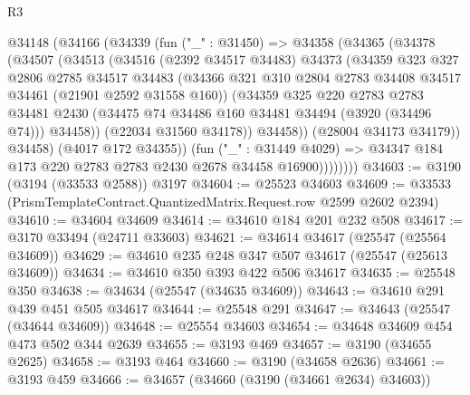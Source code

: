 \begin{lexlean}{R3}
\begin{coremodule}
            @34148
              (@34166
                (@34339
                  (fun ("_" : @31450) =>
                  @34358
                    (@34365
                      (@34378
                        (@34507
                          (@34513
                            (@34516
                              (@2392 @34517 @34483)
                              @34373
                              (@34359
                                @323
                                @327
                                @2806
                                @2785
                                @34517
                                @34483
                                (@34366
                                  @321
                                  @310
                                  @2804
                                  @2783
                                  @34408
                                  @34517
                                  @34461
                                  (@21901 @2592 @31558 @160))
                                (@34359
                                  @325
                                  @220
                                  @2783
                                  @2783
                                  @34481
                                  @2430
                                  (@34475 @74 @34486 @160 @34481 @34494 (@3920 (@34496 @74)))
                                  @34458))
                              (@22034 @31560 @34178))
                            @34458))
                        (@28004 @34173 @34179))
                      @34458)
                    (@4017 @172 @34355))
                  (fun ("_" : @31449 @4029) =>
                  @34347 @184 @173 @220 @2783 @2783 @2430 @2678 @34458 @16900))))))))
@34603 := @3190 (@3194 (@33533 @2588)) @3197
@34604 := @25523 @34603
@34609 := @33533 (PrismTemplateContract.QuantizedMatrix.Request.row @2599 @2602 @2394)
@34610 := @34604 @34609
@34614 := @34610 @184 @201 @232 @508
@34617 := @3170 @33494 (@24711 @33603)
@34621 := @34614 @34617 (@25547 (@25564 @34609))
@34629 := @34610 @235 @248 @347 @507 @34617 (@25547 (@25613 @34609))
@34634 := @34610 @350 @393 @422 @506 @34617
@34635 := @25548 @350
@34638 := @34634 (@25547 (@34635 @34609))
@34643 := @34610 @291 @439 @451 @505 @34617
@34644 := @25548 @291
@34647 := @34643 (@25547 (@34644 @34609))
@34648 := @25554 @34603
@34654 := @34648 @34609 @454 @473 @502 @344 @2639
@34655 := @3193 @469
@34657 := @3190 (@34655 @2625)
@34658 := @3193 @464
@34660 := @3190 (@34658 @2636)
@34661 := @3193 @459
@34666 := @34657 (@34660 (@3190 (@34661 @2634) @34603))

\end{coremodule}
\end{lexlean}

